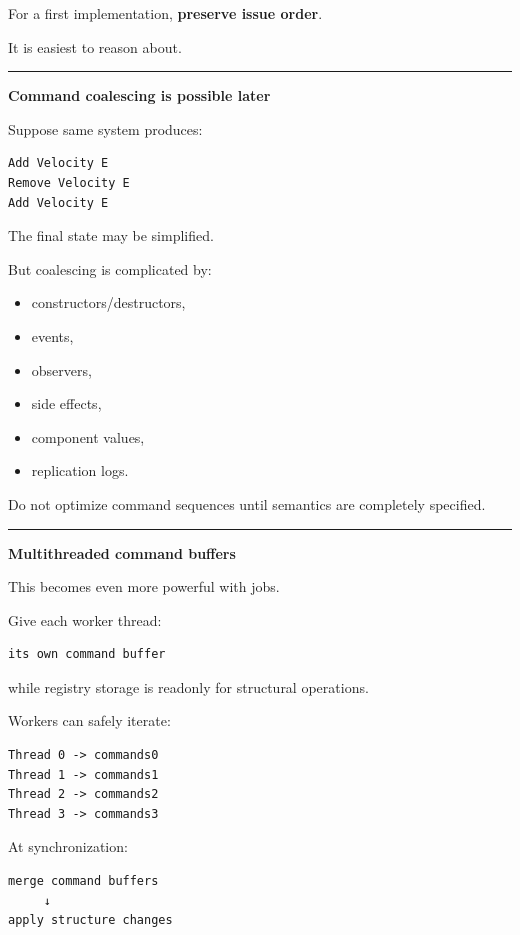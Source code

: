 For a first implementation, \textbf{preserve issue order}.

It is easiest to reason about.

\begin{center}\rule{0.5\linewidth}{0.5pt}\end{center}

\textbf{Command coalescing is possible later}

Suppose same system produces:

\begin{verbatim}
Add Velocity E
Remove Velocity E
Add Velocity E
\end{verbatim}

The final state may be simplified.

But coalescing is complicated by:

\begin{itemize}
\tightlist
\item
  constructors/destructors,
\item
  events,
\item
  observers,
\item
  side effects,
\item
  component values,
\item
  replication logs.
\end{itemize}

Do not optimize command sequences until semantics are completely specified.

\begin{center}\rule{0.5\linewidth}{0.5pt}\end{center}

\textbf{Multithreaded command buffers}

This becomes even more powerful with jobs.

Give each worker thread:

\begin{verbatim}
its own command buffer
\end{verbatim}

while registry storage is readonly for structural operations.

Workers can safely iterate:

\begin{verbatim}
Thread 0 -> commands0
Thread 1 -> commands1
Thread 2 -> commands2
Thread 3 -> commands3
\end{verbatim}

At synchronization:

\begin{verbatim}
merge command buffers
     ↓
apply structure changes
\end{verbatim}

